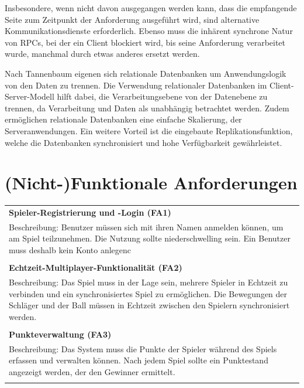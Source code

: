 \documentclass[
]{article}
\begin{document}
\glqq Insbesondere, wenn nicht davon ausgegangen werden kann, 
dass die empfangende Seite zum Zeitpunkt der Anforderung ausgeführt wird, 
sind alternative Kommunikationsdienste erforderlich. 
Ebenso muss die inhärent synchrone Natur von RPCs, 
bei der ein Client blockiert wird, bis seine Anforderung verarbeitet wurde, 
manchmal durch etwas anderes ersetzt werden.\grqq{} \cite[S. 140 ff.]{tanenbaum2007distributed}



Nach Tannenbaum eigenen sich relationale Datenbanken um Anwendungslogik von den Daten zu trennen.
\glqq Die Verwendung relationaler Datenbanken im Client-Server-Modell hilft dabei, 
die Verarbeitungsebene von der Datenebene zu trennen, da Verarbeitung und Daten als unabhängig betrachtet werden.\grqq{} \cite[S. 40 ff.]{tanenbaum2007distributed}
Zudem ermöglichen relationale Datenbanken eine einfache Skalierung, der Serveranwendungen.
Ein weitere Vorteil ist die eingebaute Replikationsfunktion, welche die Datenbanken synchronisiert und hohe Verfügbarkeit gewährleistet.\cite[Chapter 27]{postgresql-high-availability}


\section{(Nicht-)Funktionale Anforderungen}
\begin{center}
  \begin{tabular}{|p{\linewidth}|}
    \hline
    \textbf{Spieler-Registrierung und -Login (FA1)} \\
    Beschreibung: Benutzer müssen sich mit ihren Namen anmelden können, um am Spiel teilzunehmen.
    Die Nutzung sollte niederschwelling sein. Ein Benutzer muss deshalb kein Konto anlegenc \\ \\
    \hline
    \textbf{Echtzeit-Multiplayer-Funktionalität (FA2)} \\
    Beschreibung: Das Spiel muss in der Lage sein, mehrere Spieler in Echtzeit zu verbinden und ein synchronisiertes Spiel zu ermöglichen. Die Bewegungen der Schläger und der Ball müssen in Echtzeit zwischen den Spielern synchronisiert werden.\\ \\
    \hline
    \textbf{Punkteverwaltung (FA3)} \\
    Beschreibung: Das System muss die Punkte der Spieler während des Spiels erfassen und verwalten können. Nach jedem Spiel sollte ein Punktestand angezeigt werden, der den Gewinner ermittelt. \\ \\
    \hline
  \end{tabular}
\end{center}
\end{document}
